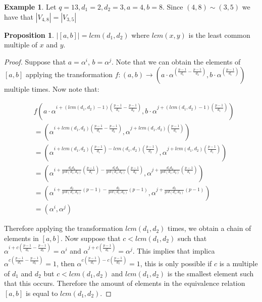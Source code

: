 \documentclass{article}
\theoremstyle{definition}
\newtheorem{example}[theorem]{Example}
\newtheorem{prop}[theorem]{Proposition}
\theoremstyle{remark}
\numberwithin{equation}{section}
\begin{document}
 \begin{example}
    Let $q = 13, d_1 = 2, d_2 = 3, a = 4, b = 8$. Since $(4,8) \sim (3,5)$ we have that $|V_{4, 8}| = |V_{3, 5}|$
  \end{example}

\begin{prop}
  
  $|[a, b]| = lcm(d_1,d_2)$ where $lcm(x,y)$ is the least common multiple of $x$ and $y$.

\end{prop}

\begin{proof}

  Suppose that $a=\alpha^i$, $b=\alpha^j$. Note that we can obtain the elements of $[a,b]$ applying the transformation $f:(a,b) \rightarrow ( a\cdot\alpha^{(\frac{p-1}{d_1} - \frac{p-1}{d_2})}, b\cdot\alpha^{(\frac{p-1}{d_1})} )$ multiple times. Now note that:

  \begin{align*}
  & f(a\cdot \alpha^{i+(lcm(d_1,d_2) - 1)(\frac{p-1}{d_1} - \frac{p-1}{d_2})}, b\cdot\alpha^{j+(lcm(d_1,d_2) - 1)(\frac{p-1}{d_1})}) \\
  & = (\alpha^{i+lcm(d_1,d_2)(\frac{p-1}{d_1}-\frac{p-1}{d_2})}, \alpha^{j+lcm(d_1,d_2)(\frac{p-1}{d_1})}) \\
  & = (\alpha^{i+lcm(d_1,d_2)(\frac{p-1}{d_1})-lcm(d_1,d_2)(\frac{p-1}{d_2})}, \alpha^{j+lcm(d_1,d_2)(\frac{p-1}{d_1})}) \\
    & = (\alpha^{i+\frac{d_1d_2}{gcd(d_1,d_2)}(\frac{p-1}{d_1})-\frac{d_1d_2}{gcd(d_1,d_2)}(\frac{p-1}{d_2})}, \alpha^{j+\frac{d_1d_2}{gcd(d_1,d_2)}(\frac{p-1}{d_1})}) \\
  & = (\alpha^{i+\frac{d_2}{gcd(d_1,d_2)}(p-1)-\frac{d_2}{gcd(d_1,d_2)}(p-1)}, \alpha^{j+\frac{d_2}{gcd(d_1,d_2)}(p-1)}) \\
  & = (\alpha^i, \alpha^j)
  \end{align*}

  Therefore applying the transformation $lcm(d_1,d_2)$ times, we obtain a chain of elements in $[a,b]$. Now suppose that $c < lcm(d_1,d_2)$ such that $\alpha^{i+c(\frac{p-1}{d_1} - \frac{p-1}{d_2})} = \alpha^i$ and $\alpha^{j+c(\frac{p-1}{d_1})} = \alpha^j$. This implies that implica $\alpha^{c(\frac{p-1}{d_1} - \frac{p-1}{d_2})} = 1$, then $\alpha^{c(\frac{p-1}{d_1}) - c(\frac{p-1}{d_2})} = 1$, this is only possible if $c$ is a multiple of $d_1$ and $d_2$ but $c < lcm(d_1,d_2)$ and $lcm(d_1,d_2)$ is the smallest element such that this occurs. Therefore the amount of elements in the equivalence relation $[a,b]$ is equal to $lcm(d_1,d_2)$.
  
\end{proof}
\end{document}
